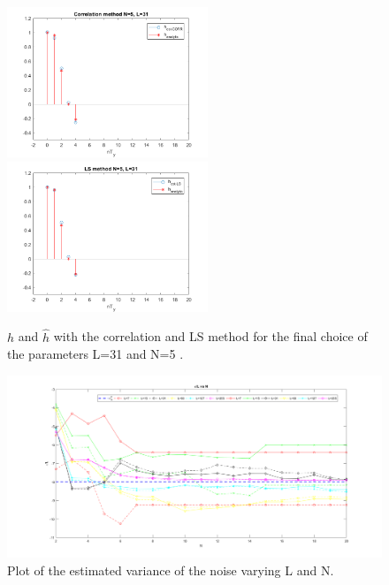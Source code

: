 \documentclass[a4paper,11.5pt]{article}
\begin{document}
\begin{figure}[ht]
	\begin{center}    
		\includegraphics[width=6cm]{figs/corrN5L31.png}
		\includegraphics[width=6cm]{figs/lsN5L31.png}
		\caption{$h$ and $\hat{h}$ with the correlation and LS method for the final choice of the parameters L=31 and N=5 .}
		\label{fig:hest}
	\end{center}
\end{figure} 
 
 \begin{figure}[ht]
 	\begin{center}    
 		\includegraphics[width=\textwidth]{figs/L-N-choice.png}
 		\caption{Plot of the estimated variance of the noise varying L and N.}
 		\label{fig:L-N}
 	\end{center}
 \end{figure} 
\end{document}
